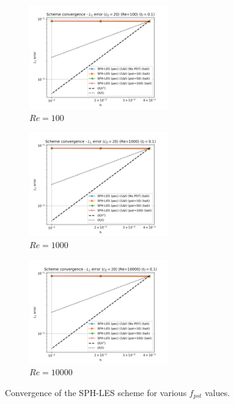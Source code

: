\begin{figure}[H]
  \begin{subfigure}{7cm}
    \centering\includegraphics[width=6cm]{Code-Figures/okra2022/pst/dt_pois_conv_c0_20_re_100.png}
    \caption{$Re = 100$}
  \end{subfigure}
  \begin{subfigure}{7cm}
    \centering\includegraphics[width=6cm]{Code-Figures/okra2022/pst/dt_pois_conv_c0_20_re_1000.png}
    \caption{$Re = 1000$}
  \end{subfigure}
  \begin{subfigure}{7cm}
    \centering\includegraphics[width=6cm]{Code-Figures/okra2022/pst/dt_pois_conv_c0_20_re_10000.png}
    \caption{$Re = 10000$}
  \end{subfigure}
  \caption{Convergence of the SPH-LES scheme for various $f_{pst}$ values.}
  \label{fig:okra2022-pst}
\end{figure}


